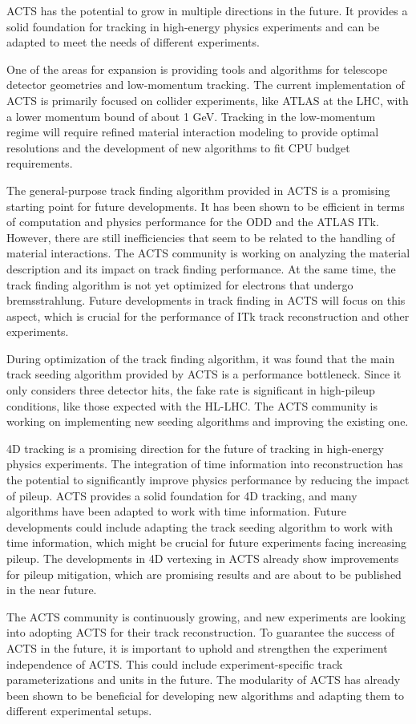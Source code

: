 ACTS has the potential to grow in multiple directions in the future. It provides a solid foundation for tracking in high-energy physics experiments and can be adapted to meet the needs of different experiments.

One of the areas for expansion is providing tools and algorithms for telescope detector geometries and low-momentum tracking. The current implementation of ACTS is primarily focused on collider experiments, like ATLAS at the LHC, with a lower momentum bound of about 1 GeV. Tracking in the low-momentum regime will require refined material interaction modeling to provide optimal resolutions and the development of new algorithms to fit CPU budget requirements.

The general-purpose track finding algorithm provided in ACTS is a promising starting point for future developments. It has been shown to be efficient in terms of computation and physics performance for the ODD and the ATLAS ITk. However, there are still inefficiencies that seem to be related to the handling of material interactions. The ACTS community is working on analyzing the material description and its impact on track finding performance. At the same time, the track finding algorithm is not yet optimized for electrons that undergo bremsstrahlung. Future developments in track finding in ACTS will focus on this aspect, which is crucial for the performance of ITk track reconstruction and other experiments.

During optimization of the track finding algorithm, it was found that the main track seeding algorithm provided by ACTS is a performance bottleneck. Since it only considers three detector hits, the fake rate is significant in high-pileup conditions, like those expected with the HL-LHC. The ACTS community is working on implementing new seeding algorithms and improving the existing one.

4D tracking is a promising direction for the future of tracking in high-energy physics experiments. The integration of time information into reconstruction has the potential to significantly improve physics performance by reducing the impact of pileup. ACTS provides a solid foundation for 4D tracking, and many algorithms have been adapted to work with time information. Future developments could include adapting the track seeding algorithm to work with time information, which might be crucial for future experiments facing increasing pileup. The developments in 4D vertexing in ACTS already show improvements for pileup mitigation, which are promising results and are about to be published in the near future.

The ACTS community is continuously growing, and new experiments are looking into adopting ACTS for their track reconstruction. To guarantee the success of ACTS in the future, it is important to uphold and strengthen the experiment independence of ACTS. This could include experiment-specific track parameterizations and units in the future. The modularity of ACTS has already been shown to be beneficial for developing new algorithms and adapting them to different experimental setups.
